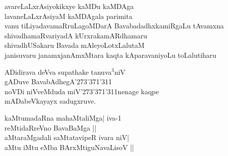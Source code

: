 \begin{entry}
\begin{shl}
avareLaLxrAsiyokikxye kaMDu kaMDAga\\
lavaneLaLxrAsiyaM kaMDAgala parimita\\
vanu tiLiyadavamaRruLagoMDarA BavabadadhxkamiRgaLu tAvamxna\\
shivadhamaRvariyadA kUrxrakamARdhamaru\\
shivadhUSakaru Bavada mAleyoLotxLalutaM\\
janisuvaru janamxjanAmxMtara kaqta kAparavaniyoLu toLalutiharu
\end{shl}
\end{entry}

\begin{entry}
\gl{}
\begin{shl}
ADidirava deVva supathake tanuva$^3$niV\\
gADuve BavabAdhegA\char'273\char'371\char'311\\
noVDi niVveMduda miV\char'273\char'371\char'311nenage kaqpe\\
mADabeVkayayx sadugxruve.
\end{shl}
\end{entry}

\begin{entry}
\end{entry}

\begin{entry}
\begin{shl}
kaMtumadaRna mahaMtaliMga| iva-1\\
reMtidaRreVno BavaBaMga ||\\
aMtaraMgadali saMtatavipeR ivara niV|\\
aMtu iMtu eMba BArxMtiguNavaLisoV ||
\end{shl}
\end{entry}

\begin{entry}
\gl{}

\end{entry}

